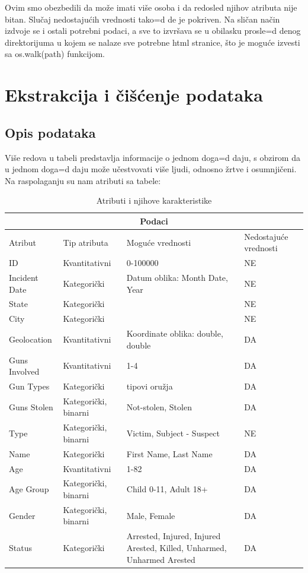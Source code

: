 \documentclass[12pt, a4paper]{article}
\def\dj{\leavevmode\setbox0=\hbox{d}\kern0pt
\rlap{\kern.215em\raise.46\ht0\hbox{-}}d}
\begin{document}
\newpage
Ovim smo obezbedili da mo\v ze imati vi\v se osoba i da redosled njihov atributa nije bitan. Slu\v caj nedostaju\' cih vrednosti tako\dj e je pokriven. Na sli\v can na\v cin izdvoje se i ostali potrebni podaci, a sve to izvr\v sava se u obilasku prosle\dj enog direktorijuma u kojem se nalaze sve potrebne html stranice, \v sto je mogu\' ce izvesti sa os.walk(path) funkcijom.

\section {Ekstrakcija i \v ci\v s\' cenje podataka}
\subsection {Opis podataka}

Vi\v se redova u tabeli predstavlja informacije o jednom doga\dj aju, s obzirom da u jednom doga\dj aju 
mo\v ze u\v cestvovati vi\v se ljudi, odnosno \v zrtve i osumnji\v ceni.
\break
Na raspolaganju su nam atributi sa tabele:

\begin{table}[H]
\label{table:atributi}
\begin{tabular}{ |p{3cm}||p{3cm}|p{6.5cm}|p{3cm}|  }
 \hline
 \multicolumn{4}{|c|}{Podaci} \\
 \hline
 	Atribut& Tip atributa &Mogu\' ce vrednosti &Nedostaju\' ce vrednosti\\
 \hline
 	ID & Kvantitativni & 0-100000	& NE \\
 	Incident Date& Kategori\v cki & Datum oblika: Month Date, Year & NE \\
 	State& Kategori\v cki& & NE\\
 	City& Kategori\v cki& & NE\\
 	Geolocation& Kvantitativni& Koordinate oblika: double, double & DA\\
 	Guns Involved& Kvantitativni& 1-4& DA\\
 	Gun Types& Kategori\v cki& tipovi oru\v zja& DA\\
 	Guns Stolen& Kategori\v cki, binarni& Not-stolen, Stolen& DA\\
 	Type& Kategori\v cki, binarni & Victim, Subject - Suspect & NE\\
 	Name& Kategori\v cki & First Name, Last Name & DA\\
 	Age& Kvantitativni & 1-82 & DA \\
 	Age Group& Kategori\v cki, binarni & Child 0-11, Adult 18+ & DA\\
 	Gender& Kategori\v cki, binarni & Male, Female & DA \\
 	Status& Kategori\v cki & Arrested, Injured, Injured Arested, Killed, Unharmed, Unharmed Arested & DA \\
 \hline
\end{tabular}
\caption{Atributi i njihove karakteristike}
\end{table}
\end{document}

